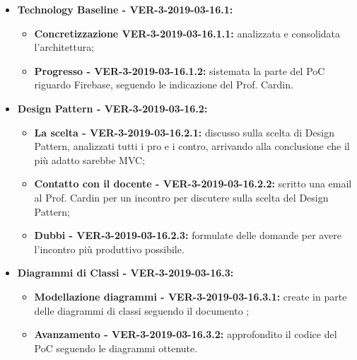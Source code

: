 \documentclass[a4paper, oneside, openany, dvipsnames, table]{article}
\begin{document}
\begin{itemize}
\item \textbf{Technology Baseline - VER-3-2019-03-16.1:} 
	\begin{itemize}
		\item \textbf{Concretizzazione VER-3-2019-03-16.1.1:} analizzata e consolidata l'architettura;
		\item \textbf{Progresso - VER-3-2019-03-16.1.2:} sistemata la parte del PoC riguardo Firebase, seguendo le indicazione del Prof. Cardin.
	\end{itemize}
\item \textbf{Design Pattern - VER-3-2019-03-16.2:}
	\begin{itemize}
	\item  \textbf{La scelta  - VER-3-2019-03-16.2.1:} discusso sulla scelta di Design Pattern, analizzati tutti i pro e i contro, arrivando alla conclusione che il più adatto sarebbe MVC;
	\item \textbf{Contatto con il docente - VER-3-2019-03-16.2.2:} scritto una email al Prof. Cardin per un incontro per discutere sulla scelta del Design Pattern;
	\item \textbf{Dubbi - VER-3-2019-03-16.2.3:} formulate delle domande per avere l'incontro più produttivo possibile. 	
	\end{itemize}
\item \textbf{Diagrammi di Classi - VER-3-2019-03-16.3:}
	\begin{itemize}
		\item \textbf{Modellazione diagrammi - VER-3-2019-03-16.3.1:} create in parte delle diagrammi di classi seguendo il documento \AdR;
		\item \textbf{Avanzamento - VER-3-2019-03-16.3.2:} approfondito il codice del PoC  seguendo le diagrammi ottenute.
	\end{itemize}
\end{itemize}
\end{document}
